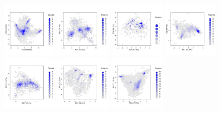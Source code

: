 \documentclass[12pt]{article}\usepackage[]{graphicx}\usepackage[]{color}
\begin{document}
\begin{figure}[p]
  \includegraphics[width = 0.24\textwidth]{./figure/fighexpca-13.pdf}
  \includegraphics[width = 0.24\textwidth]{./figure/fighexpca-14.pdf}
  \includegraphics[width = 0.24\textwidth]{./figure/fighexpca-15.pdf}
  \includegraphics[width = 0.24\textwidth]{./figure/fighexpca-16.pdf}
  \includegraphics[width = 0.24\textwidth]{./figure/fighexpca-17.pdf}
  \includegraphics[width = 0.24\textwidth]{./figure/fighexpca-18.pdf}
  \includegraphics[width = 0.24\textwidth]{./figure/fighexpca-19.pdf}

\end{figure}
\end{document}
